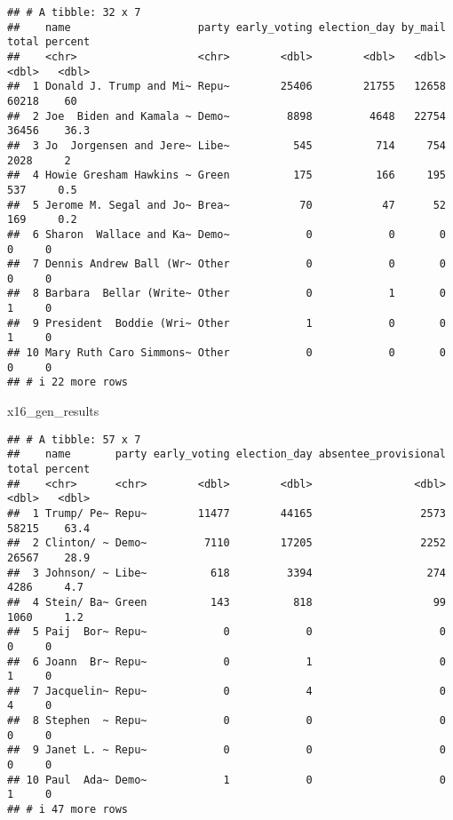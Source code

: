 \documentclass[
]{article}
\newenvironment{Shaded}{\begin{snugshade}}{\end{snugshade}}
\newcommand{\NormalTok}[1]{#1}
\begin{document}
\begin{verbatim}
## # A tibble: 32 x 7
##    name                    party early_voting election_day by_mail total percent
##    <chr>                   <chr>        <dbl>        <dbl>   <dbl> <dbl>   <dbl>
##  1 Donald J. Trump and Mi~ Repu~        25406        21755   12658 60218    60  
##  2 Joe  Biden and Kamala ~ Demo~         8898         4648   22754 36456    36.3
##  3 Jo  Jorgensen and Jere~ Libe~          545          714     754  2028     2  
##  4 Howie Gresham Hawkins ~ Green          175          166     195   537     0.5
##  5 Jerome M. Segal and Jo~ Brea~           70           47      52   169     0.2
##  6 Sharon  Wallace and Ka~ Demo~            0            0       0     0     0  
##  7 Dennis Andrew Ball (Wr~ Other            0            0       0     0     0  
##  8 Barbara  Bellar (Write~ Other            0            1       0     1     0  
##  9 President  Boddie (Wri~ Other            1            0       0     1     0  
## 10 Mary Ruth Caro Simmons~ Other            0            0       0     0     0  
## # i 22 more rows
\end{verbatim}

\begin{Shaded}
\begin{Highlighting}[]
\NormalTok{x16\_gen\_results}
\end{Highlighting}
\end{Shaded}

\begin{verbatim}
## # A tibble: 57 x 7
##    name       party early_voting election_day absentee_provisional total percent
##    <chr>      <chr>        <dbl>        <dbl>                <dbl> <dbl>   <dbl>
##  1 Trump/ Pe~ Repu~        11477        44165                 2573 58215    63.4
##  2 Clinton/ ~ Demo~         7110        17205                 2252 26567    28.9
##  3 Johnson/ ~ Libe~          618         3394                  274  4286     4.7
##  4 Stein/ Ba~ Green          143          818                   99  1060     1.2
##  5 Paij  Bor~ Repu~            0            0                    0     0     0  
##  6 Joann  Br~ Repu~            0            1                    0     1     0  
##  7 Jacquelin~ Repu~            0            4                    0     4     0  
##  8 Stephen  ~ Repu~            0            0                    0     0     0  
##  9 Janet L. ~ Repu~            0            0                    0     0     0  
## 10 Paul  Ada~ Demo~            1            0                    0     1     0  
## # i 47 more rows
\end{verbatim}
\end{document}
